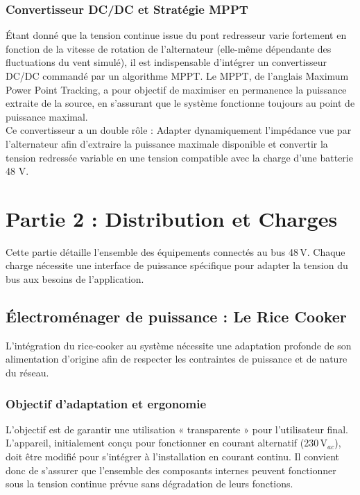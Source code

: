 \subsubsection{Convertisseur DC/DC et Stratégie MPPT}

Étant donné que la tension continue issue du pont redresseur varie fortement en fonction de la vitesse de rotation de l’alternateur (elle-même dépendante des fluctuations du vent simulé), il est indispensable d’intégrer un convertisseur DC/DC commandé par un algorithme MPPT. Le MPPT, de l'anglais Maximum Power Point Tracking, a pour objectif de maximiser en permanence la puissance extraite de la source, en s’assurant que le système fonctionne toujours au point de puissance maximal. \\
Ce convertisseur a un double rôle : Adapter dynamiquement l’impédance vue par l’alternateur afin d’extraire la puissance maximale disponible et convertir la tension redressée variable en une tension compatible avec la charge d’une batterie 48 V.

\section{Partie 2 : Distribution et Charges}
\label{sec:distribution}

Cette partie détaille l'ensemble des équipements connectés au bus 48\,V. Chaque charge nécessite une interface de puissance spécifique pour adapter la tension du bus aux besoins de l'application.

\subsection{Électroménager de puissance : Le Rice Cooker}
\label{subsec:rice_cooker}

L'intégration du rice-cooker au système nécessite une adaptation profonde de son alimentation d'origine afin de respecter les contraintes de puissance et de nature du réseau.

\subsubsection{Objectif d'adaptation et ergonomie}
L'objectif est de garantir une utilisation « transparente » pour l'utilisateur final. L'appareil, initialement conçu pour fonctionner en courant alternatif (230\,V$_{ac}$), doit être modifié pour s'intégrer à l'installation en courant continu. Il convient donc de s'assurer que l'ensemble des composants internes peuvent fonctionner sous la tension continue prévue sans dégradation de leurs fonctions.

